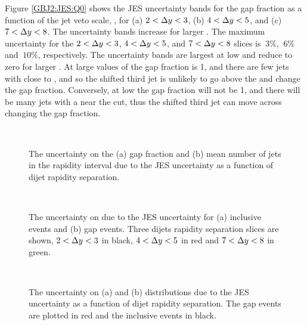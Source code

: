 Figure \ref{GBJ2:JES:Q0} shows the JES uncertainty bands for the gap fraction as a function of the jet veto scale, \qz{}, for (a) $2<\mbox{$\Delta y$}{}<3$, (b) $4<\mbox{$\Delta y$}{}<5$, and (c) $7<\mbox{$\Delta y$}{}<8$.
The uncertainty bands increase for larger \dy{}.
The maximum uncertainty for the $2<\mbox{$\Delta y$}{}<3$,  $4<\mbox{$\Delta y$}{}<5$, and  $7<\mbox{$\Delta y$}{}<8$ slices is $~3\%$, $~6\%$ and $~10\%$, respectively.
The uncertainty bands are largest at low \qz{} and reduce to zero for larger \qz{}.
At large values of \qz{} the gap fraction is 1, and there are few jets with \pt{} close to \qz{}, and so the shifted third jet is unlikely to go above the \qz{} and change the gap fraction.
Conversely, at low \qz{} the gap fraction will not be 1, and there will be many jets with a \pt{} near the \qz{} cut, thus the shifted third jet \pt{}  can move across \qz{} changing the gap fraction.


\begin{figure}
\centering
\mbox{
              \quad
              \quad
                              }
\caption[Uncertainty bands due to the JES uncertainty for gap fraction and mean number of jets]{
The uncertainty on the (a) gap fraction and (b) mean number of jets in the rapidity interval due to the JES uncertainty as a function of dijet rapidity separation. 
\label{GBJ2:JES:gap_njets}}
\end{figure}



\begin{figure}
\centering
\mbox{
              \quad
              \quad
                              }
\caption[Uncertainty bands due to the JES uncertainty for \dphiDist{}]{
The uncertainty on \dphiDist{} due to the JES uncertainty for (a) inclusive events and (b) gap events. 
Three dijets rapidity separation slices are shown, $2<\mbox{$\Delta y$}{}<3$ in black, $4<\mbox{$\Delta y$}{}<5$ in red and $7<\mbox{$\Delta y$}{}<8$ in green.
\label{GBJ2:JES:dPhi}}
\end{figure}


\begin{figure}
\centering
\mbox{
              \quad
              \quad
                              }
\caption[Uncertainty bands due to the JES uncertainty for \mean{\cosdphi{}} and  \mean{\costwodphi{}}]{
The uncertainty on (a) \mean{\cosdphi{}} and (b) \mean{\costwodphi{}} distributions due to the JES uncertainty as a function of dijet rapidity separation.
The gap events are plotted in red and the inclusive events in black.
\label{GBJ2:JES:cos}}
\end{figure}


